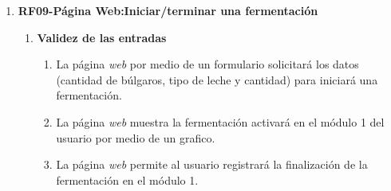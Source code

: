 \begin{enumerate}
\begin{enumerate}
                \item \textbf{Respuestas a situaciones anormales}
                    \begin{enumerate}
                        \item Si las credenciales son inválidas, la página \textit{web} muestrará un mensaje de error y permite al usuario intentar iniciar sesión nuevamente.
                    \end{enumerate}   
        
                \item \textbf{Efecto de los parámetros}
                    \begin{enumerate}
                        \item La página \textit{web} deberá solicitar una credencial tanto para el usuario como para el admin, con un mínimo de 8 caracteres contando con 1 letra mayúscula, 1 letra minúscula y 1 número.
                        \item La página \textit{web} deberá cifrar las credenciales del usuario o admin antes de enviarlas a la base de datos para garantizar la seguridad.
                    \end{enumerate}   
                \item \textbf{Relación entre las salidas y las entradas}
                    \begin{enumerate}
                        \item La página deberá generar un token de sesión único para el usuario o admin al iniciar sesión exitosamente, que se utilizará para mantener la sesión activa.
                    \end{enumerate}
        \end{enumerate}
        
         \item \label{it:RF09} \textbf{RF09-Página Web:Iniciar/terminar una fermentación}
        \begin{enumerate}
                \item \textbf{Validez de las entradas}
                    \begin{enumerate}
                        \item La página \textit{web} por medio de un formulario solicitará los datos 
                        (cantidad de búlgaros, tipo de leche y cantidad) para iniciará una fermentación. 
                        \item La página \textit{web} muestra la fermentación activará en el módulo 1 del usuario por medio de un grafico.
                        \item La página \textit{web} permite al usuario registrará la finalización de la fermentación en el módulo 1.
                    \end{enumerate}   
                

\end{enumerate}
\end{enumerate}
